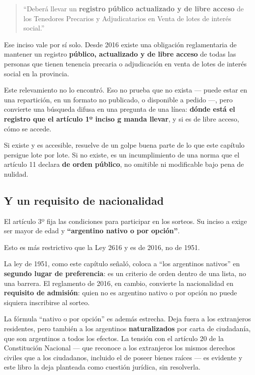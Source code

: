 \begin{quote}
``Deberá llevar un \textbf{registro público actualizado y de libre acceso} de los Tenedores Precarios y Adjudicatarios en Venta de lotes de interés social.''
\end{quote}

\begin{cautela}
Ese inciso vale por sí solo. Desde 2016 existe una obligación reglamentaria de mantener un registro \textbf{público, actualizado y de libre acceso} de todas las personas que tienen tenencia precaria o adjudicación en venta de lotes de interés social en la provincia.

Este relevamiento no lo encontró. Eso no prueba que no exista --- puede estar en una repartición, en un formato no publicado, o disponible a pedido ---, pero convierte una búsqueda difusa en una pregunta de una línea: \textbf{dónde está el registro que el artículo 1º inciso g manda llevar}, y si es de libre acceso, cómo se accede.

Si existe y es accesible, resuelve de un golpe buena parte de lo que este capítulo persigue lote por lote. Si no existe, es un incumplimiento de una norma que el artículo 11 declara \textbf{de orden público}, no omitible ni modificable bajo pena de nulidad.
\end{cautela}

\subsection*{Y un requisito de nacionalidad}

El artículo 3º fija las condiciones para participar en los sorteos. Su inciso a exige ser mayor de edad y \textbf{``argentino nativo o por opción''}.

\begin{cautela}
Esto es más restrictivo que la Ley 2616 y es de 2016, no de 1951.

La ley de 1951, como este capítulo señaló, coloca a ``los argentinos nativos'' en \textbf{segundo lugar de preferencia}: es un criterio de orden dentro de una lista, no una barrera. El reglamento de 2016, en cambio, convierte la nacionalidad en \textbf{requisito de admisión}: quien no es argentino nativo o por opción no puede siquiera inscribirse al sorteo.

La fórmula ``nativo o por opción'' es además estrecha. Deja fuera a los extranjeros residentes, pero también a los argentinos \textbf{naturalizados} por carta de ciudadanía, que son argentinos a todos los efectos. La tensión con el artículo 20 de la Constitución Nacional --- que reconoce a los extranjeros los mismos derechos civiles que a los ciudadanos, incluido el de poseer bienes raíces --- es evidente y este libro la deja planteada como cuestión jurídica, sin resolverla.
\end{cautela}

